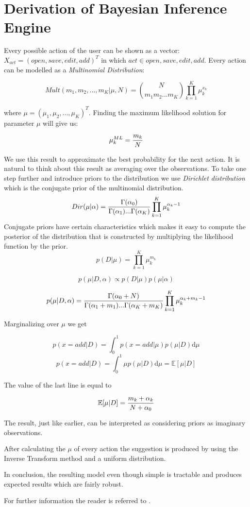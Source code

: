 \section{ Derivation of Bayesian Inference Engine}
Every possible action of the user can be shown as a vector: $X_{act}=(open, save, edit, add)^T$ in which  $act \in {open, save, edit, add}$. Every action can be modelled as a \textit{Multinomial Distribution}:

\[
Mult(m_1,m_2,...,m_K|\mu,N)={N \choose m_1 m_2 ... m_K}\prod_{k=1}^K \mu_{k}^{x_k}
\]

where $\mu=(\mu_1,\mu_2,...,\mu_K)^T$. Finding the maximum likelihood solution for parameter $\mu$ will give us:

\[
\mu_k^{ML}={m_k \over N} 
\]

We use this result to approximate the best probability for the next action. It is natural to think about this result as averaging over the observations.
To take one step further and introduce priors to the distribution we use \textit{Dirichlet distribution} which is the conjugate prior of the multinomial distribution.
\[
Dir(\mu|\alpha)={\Gamma(\alpha_0) \over \Gamma(\alpha_1)...\Gamma(\alpha_K)}\prod_{k=1}^K \mu_{k}^{\alpha_k -1}
\]
Conjugate priors have certain characteristics which makes it easy to compute the posterior of the distribution that is constructed by multiplying the likelihood function by the prior.  
\[
p(D|\mu)=\prod_{k=1}^K {\mu_{k}^{m_k}}\]

\[p(\mu| D,\alpha) \propto p(D|\mu)  p(\mu|\alpha)\]

\[p(\mu|D, \alpha)={\Gamma(\alpha_0+N) \over {\Gamma(\alpha_1+m_1)...\Gamma(\alpha_K+m_K)}}\prod_{k=1}^K \mu_{k}^{\alpha_k+m_k-1}\]

Marginalizing over $\mu$ we get 

\[p(x=add|D)=\int_0^1 p(x=add|\mu)p(\mu|D) \mathrm{d}\mu\]
\[p(x=add|D)=\int_0^1 \mu p(\mu|D)\mathrm{d}\mu = \mathbb{E}[\mu|D]\]

The value of the last line is equal to

\[\mathbb{E}[\mu|D]={m_k+\alpha_k \over {N+\alpha_0}} \]

The result, just like earlier, can be interpreted as considering priors as imaginary observations.

After calculating the $\mu$ of every action the suggestion is produced by using the Inverse Transform method and a uniform distribution.

In conclusion, the resulting model even though simple is tractable and produces expected results which are fairly robust.

For further information the reader is referred to \cite{Bishop2007}. 
